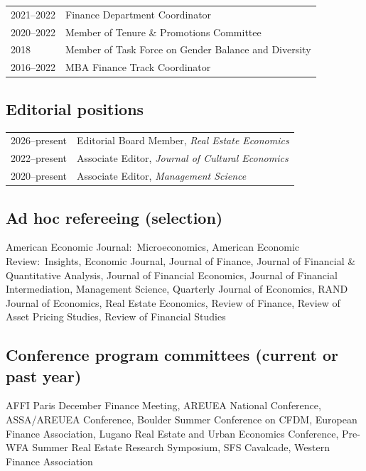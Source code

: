 \documentclass[a4paper]{article}
\begin{document}
\begin{tabular}{p{2cm} p{14.7cm}}

2021--2022 & Finance Department Coordinator\\[0.25cm] 

2020--2022 & Member of Tenure \& Promotions Committee\\[0.25cm] 

2018 & Member of Task Force on Gender Balance and Diversity\\[0.25cm] 

2016--2022 & MBA Finance Track Coordinator
\end{tabular}


\subsection*{Editorial positions}

\begin{tabular}{p{2cm} p{14.7cm}}

2026--present & Editorial Board Member, {\em Real Estate Economics} \\[0.25cm]  

2022--present  & Associate Editor, {\em Journal of Cultural Economics} \\[0.25cm]  

2020--present  & Associate Editor, {\em Management Science} \\[0.25cm] 
\end{tabular}

\subsection*{Ad hoc refereeing \normalsize{(selection)}}

American Economic Journal:\ Microeconomics, American Economic Review:\ Insights, Economic Journal, %
Journal of Finance, Journal of Financial \& Quantitative Analysis, Journal of Financial Economics, Journal of Financial Intermediation, Management Science, %
Quarterly Journal of Economics, RAND Journal of Economics, Real Estate Economics, Review of Finance, Review of Asset Pricing Studies, Review of Financial Studies

\subsection*{Conference program committees \normalsize{(current or past year)}}
AFFI Paris December Finance Meeting, AREUEA National Conference, ASSA/AREUEA Conference, Boulder Summer Conference on CFDM, European Finance Association, Lugano Real Estate and Urban Economics Conference, Pre-WFA Summer Real Estate Research Symposium, SFS Cavalcade, Western Finance Association
\end{document}
